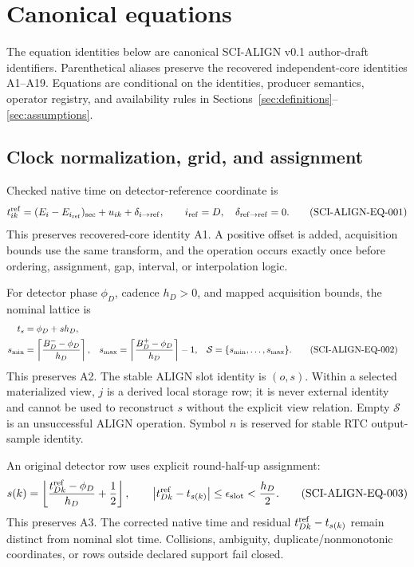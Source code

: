 \section{Canonical equations}
\label{sec:equations}

The equation identities below are canonical SCI-ALIGN v0.1 author-draft
identifiers.  Parenthetical aliases preserve the recovered independent-core
identities A1--A19.  Equations are conditional on the identities, producer
semantics, operator registry, and availability rules in
Sections~\ref{sec:definitions}--\ref{sec:assumptions}.

\subsection{Clock normalization, grid, and assignment}

Checked native time on detector-reference coordinate is
\begin{equation}
 t_{ik}^{\rm ref}=(E_i-E_{i_{\rm ref}})_{\rm sec}+u_{ik}
 +\delta_{i\rightarrow\rm ref},
 \qquad i_{\rm ref}=D,\quad \delta_{{\rm ref}\rightarrow{\rm ref}}=0.
 \tag{SCI-ALIGN-EQ-001}\label{eq:clock}
\end{equation}
\noindent This preserves recovered-core identity A1.  A positive offset is
added, acquisition bounds use the same transform, and the operation occurs
exactly once before ordering, assignment, gap, interval, or interpolation
logic.

For detector phase \(\phi_D\), cadence \(h_D>0\), and mapped acquisition
bounds, the nominal lattice is
\begin{align}
 t_s&=\phi_D+s h_D,\notag\\
 s_{\min}&=\left\lceil\frac{B_D^- -\phi_D}{h_D}\right\rceil,
 &s_{\max}&=\left\lceil\frac{B_D^+ -\phi_D}{h_D}\right\rceil-1,
 &\mathcal S&=\{s_{\min},\ldots,s_{\max}\}.
 \tag{SCI-ALIGN-EQ-002}\label{eq:grid}
\end{align}
\noindent This preserves A2.  The stable ALIGN slot identity is \((o,s)\).
Within a selected materialized view, \(j\) is a derived local storage row;
it is never external identity and cannot be used to reconstruct \(s\) without
the explicit view relation.  Empty \(\mathcal S\) is an unsuccessful ALIGN
operation.  Symbol \(n\) is reserved for stable RTC output-sample identity.

An original detector row uses explicit round-half-up assignment:
\begin{equation}
 s(k)=\left\lfloor
 \frac{t_{Dk}^{\rm ref}-\phi_D}{h_D}+\frac12
 \right\rfloor,
 \qquad
 \left|t_{Dk}^{\rm ref}-t_{s(k)}\right|
 \leq\epsilon_{\rm slot}<\frac{h_D}{2}.
 \tag{SCI-ALIGN-EQ-003}\label{eq:slot}
\end{equation}
\noindent This preserves A3.  The corrected native time and residual
\(t_{Dk}^{\rm ref}-t_{s(k)}\) remain distinct from nominal slot time.  Collisions,
ambiguity, duplicate/nonmonotonic coordinates, or rows outside declared
support fail closed.

